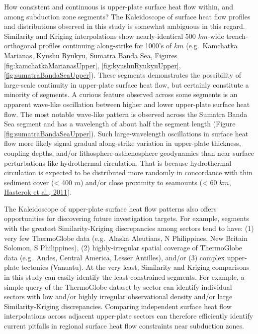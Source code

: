 How consistent and continuous is upper-plate surface heat flow within, and among subduction zone segments? The Kaleidoscope of surface heat flow profiles and distributions observed in this study is somewhat ambiguous in this regard. Similarity and Kriging interpolations show nearly-identical 500 \(km\)-wide trench-orthogonal profiles continuing along-strike for 1000's of \(km\) (e.g.~Kamchatka Marianas, Kyushu Ryukyu, Sumatra Banda Sea, Figures \ref{fig:kamchatkaMarianasUpper}, \ref{fig:kyushuRyukyuUpper}, \ref{fig:sumatraBandaSeaUpper}). These segments demonstrates the possibility of large-scale continuity in upper-plate surface heat flow, but certainly constitute a minority of segments. A curious feature observed across some segments is an apparent wave-like oscillation between higher and lower upper-plate surface heat flow. The most notable wave-like pattern is observed across the Sumatra Banda Sea segment and has a wavelength of about half the segment length (Figure \ref{fig:sumatraBandaSeaUpper}). Such large-wavelength oscillations in surface heat flow more likely signal gradual along-strike variation in upper-plate thickness, coupling depths, and/or lithosphere-asthenosphere geodynamics than near surface perturbations like hydrothermal circulation. That is because hydrothermal circulation is expected to be distributed more randomly in concordance with thin sediment cover (\textless{} 400 \(m\)) and/or close proximity to seamounts (\textless{} 60 \(km\), \protect\hyperlink{ref-hasterok2011}{Hasterok et al., 2011}).

The Kaleidoscope of upper-plate surface heat flow patterns also offers opportunities for discovering future investigation targets. For example, segments with the greatest Similarity-Kriging discrepancies among sectors tend to have: (1) very few ThermoGlobe data (e.g.~Alaska Aleutians, N Philippines, New Britain Solomon, S Philippines), (2) highly-irregular spatial coverage of ThermoGlobe data (e.g.~Andes, Central America, Lesser Antilles), and/or (3) complex upper-plate tectonics (Vanuatu). At the very least, Similarity and Kriging comparisons in this study can easily identify the least-constrained segments. For example, a simple query of the ThermoGlobe dataset by sector can identify individual sectors with low and/or highly irregular observational density and/or large Similarity-Kriging discrepancies. Comparing independent surface heat flow interpolations across adjacent upper-plate sectors can therefore efficiently identify current pitfalls in regional surface heat flow constraints near subduction zones.


